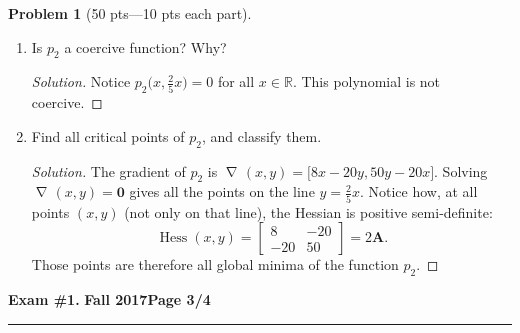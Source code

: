 \documentclass[12pt]{article}
\theoremstyle{definition}
\newtheorem{problem}{Problem}
\def\field#1{\mathbb{#1}}
\def\gradient#1{\mathop{\nabla\! {#1}}}
\def\Hess#1{\mathop{\mathrm{Hess}{#1}}}
\begin{document}
\begin{problem}[50 pts---10 pts each part]
\begin{enumerate}
\begin{center}
  \end{center}
  \item Is $p_2$ a coercive function?  Why?
  \begin{proof}[Solution]  Notice $p_2\big(x,\tfrac{2}{5}x\big)=0$ for all $x \in \field{R}$.  This polynomial is not coercive. \end{proof}
  \item Find all critical points of $p_2$, and classify them.
  \begin{proof}[Solution]
  The gradient of $p_2$ is $\gradient{p_2}(x,y) = \big[ 8x -20y, 50y - 20 x \big]$.  Solving $\gradient{p_2}(x,y) = \boldsymbol{0}$ gives all the points on the line $y = \tfrac{2}{5}x$.  Notice how, at all points $(x,y)$ (not only on that line), the Hessian is positive semi-definite:
  \begin{equation*}
  \Hess{(p_2)} (x,y ) = \begin{bmatrix} 8 & -20 \\ -20 & 50 \end{bmatrix} = 2 \boldsymbol{A}.
  \end{equation*}
  Those points are therefore all global minima of the function $p_2$.
  \end{proof}
\end{enumerate}
\end{problem}

\newpage


\hfill{\large\bf Exam \#1.}\hfill{\large\bf
  Fall 2017}\hfill{\large\bf Page 3/4}\hrule
\end{document}
